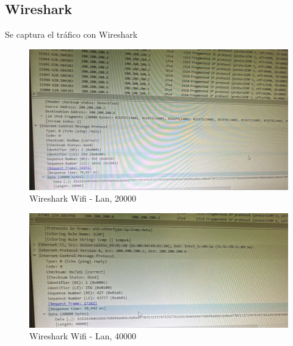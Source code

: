 \subsection{Wireshark}
Se captura el tráfico con Wireshark

\begin{figure}[H]
    \centering
    \includegraphics[width=\columnwidth]{punto1/p1_ws_wifi_lan_20k.jpeg}
    \caption{Wireshark Wifi - Lan, 20000}
    \label{fig:ws_wifi_lan_20k}
\end{figure}

\begin{figure}[H]
    \centering
    \includegraphics[width=\columnwidth]{punto1/p1_ws_wifi_lan_40k.jpeg}
    \caption{Wireshark Wifi - Lan, 40000}
    \label{fig:ws_wifi_lan_40k}
\end{figure}

